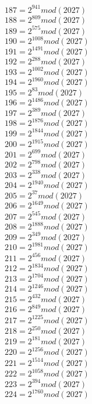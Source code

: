 \documentclass[12pt, letterpaper]{article}
\begin{document}
\begin{itemize}
\begin{multicols}{3}
$187= 2^{941} mod (2027)$\\
$188= 2^{809} mod (2027)$\\
$189= 2^{575} mod (2027)$\\
$190= 2^{1008} mod (2027)$\\
$191= 2^{1491} mod (2027)$\\
$192= 2^{288} mod (2027)$\\
$193= 2^{1002} mod (2027)$\\
$194= 2^{1960} mod (2027)$\\
$195= 2^{83} mod (2027)$\\
$196= 2^{1486} mod (2027)$\\
$197= 2^{389} mod (2027)$\\
$198= 2^{1876} mod (2027)$\\
$199= 2^{1844} mod (2027)$\\
$200= 2^{1915} mod (2027)$\\
$201= 2^{699} mod (2027)$\\
$202= 2^{798} mod (2027)$\\
$203= 2^{338} mod (2027)$\\
$204= 2^{1940} mod (2027)$\\
$205= 2^{37} mod (2027)$\\
$206= 2^{1649} mod (2027)$\\
$207= 2^{545} mod (2027)$\\
$208= 2^{1888} mod (2027)$\\
$209= 2^{349} mod (2027)$\\
$210= 2^{1981} mod (2027)$\\
$211= 2^{456} mod (2027)$\\
$212= 2^{1834} mod (2027)$\\
$213= 2^{1704} mod (2027)$\\
$214= 2^{1246} mod (2027)$\\
$215= 2^{432} mod (2027)$\\
$216= 2^{849} mod (2027)$\\
$217= 2^{1225} mod (2027)$\\
$218= 2^{250} mod (2027)$\\
$219= 2^{181} mod (2027)$\\
$220= 2^{1256} mod (2027)$\\
$221= 2^{1514} mod (2027)$\\
$222= 2^{1058} mod (2027)$\\
$223= 2^{394} mod (2027)$\\
$224= 2^{1760} mod (2027)$\\

\end{multicols}
\end{itemize}
\end{document}

